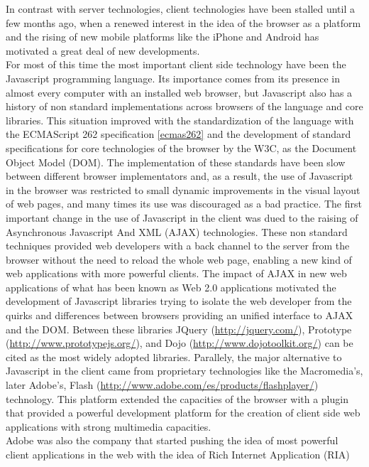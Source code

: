 In contrast with server technologies, client technologies have been stalled until a few months ago, when a renewed
interest in the idea of the browser as a platform and the rising of new mobile platforms like the iPhone and Android
has motivated a great deal of new developments.\\
For most of this time the most important client side technology have been the Javascript programming language. Its
importance comes from its presence in almost every computer with an installed web browser, but Javascript also has a
history of non standard implementations across browsers of the language and core libraries. This situation improved with the
standardization of the language with the ECMAScript 262 specification \ref{ecmas262} and the development of standard specifications
for core technologies of the browser by the W3C, as the Document Object Model (DOM). The implementation of these
standards have been slow between different browser implementators and, as a result, the use of Javascript in the
browser was restricted to small dynamic improvements in the visual layout of web pages, and many times its use was
discouraged as a bad practice. The first important change in the use of Javascript in the client was dued to the raising
of Asynchronous Javascript And XML (AJAX) technologies. These non standard techniques provided web developers with a
back channel to the server from the browser without the need to reload the whole web page, enabling a new kind of web
applications with more powerful clients. The impact of AJAX in new web applications of what has been known as Web 2.0
applications motivated the development of Javascript libraries trying to isolate the web developer from the quirks and
differences between browsers providing an unified interface to AJAX and the DOM. Between these libraries JQuery (\url{http://jquery.com/}),
Prototype (\url{http://www.prototypejs.org/}), and Dojo (\url{http://www.dojotoolkit.org/}) can be cited as the most widely adopted libraries. Parallely, the major alternative to
Javascript in the client came from proprietary technologies like the Macromedia's, later Adobe's, Flash (\url{http://www.adobe.com/es/products/flashplayer/}) technology. This
platform extended the capacities of the browser with a plugin that provided a powerful development platform for the
creation of client side web applications with strong multimedia capacities.\\ Adobe was also the company that started
pushing the idea of most powerful client applications in the web with the idea of Rich Internet Application (RIA)

